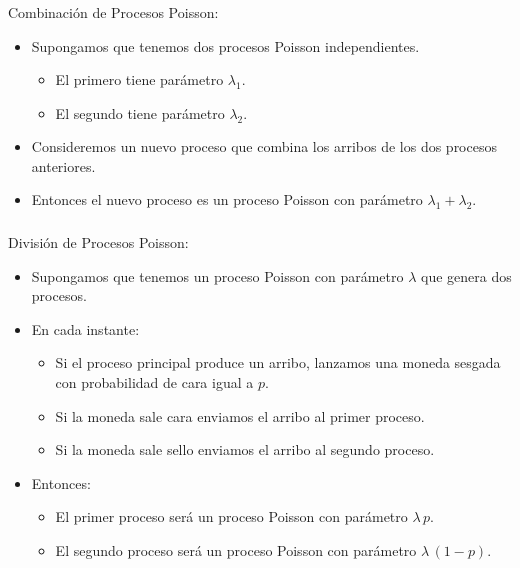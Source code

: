 \documentclass[ 10pt, xcolor = dvipsnames]{beamer}
\begin{document}
\begin{frame}[allowframebreaks]
\frametitle{\insertsection}

Combinaci\'on de Procesos Poisson: 
\begin{itemize}
\item Supongamos que tenemos dos procesos Poisson independientes. 
\begin{itemize}
\item El primero tiene par\'ametro $\lambda_1$. 
\item El segundo tiene par\'ametro $\lambda_2$. 
\end{itemize}
\item Consideremos un nuevo proceso que combina los arribos de los dos procesos anteriores. 
\item Entonces el nuevo proceso es un proceso Poisson con par\'ametro $\lambda_1 + \lambda_2$. 
\end{itemize}

\end{frame}

\begin{frame}[allowframebreaks]
\frametitle{\insertsection}

Divisi\'on de Procesos Poisson: 
\begin{itemize}
\item Supongamos que tenemos un proceso Poisson con par\'ametro $\lambda$ que genera dos procesos. 
\item En cada instante: 
\begin{itemize}
\item Si el proceso principal produce un arribo, lanzamos una moneda sesgada con probabilidad de cara igual a $p$. 
\item Si la moneda sale cara enviamos el arribo al primer proceso. 
\item Si la moneda sale sello enviamos el arribo al segundo proceso. 
\end{itemize}
\item Entonces: 
\begin{itemize}
\item El primer proceso ser\'a un proceso Poisson con par\'ametro $\lambda \, p$. 
\item El segundo proceso ser\'a un proceso Poisson con par\'ametro $\lambda \, (1-p)$. 
\end{itemize}
\end{itemize}

\end{frame}
\end{document}
